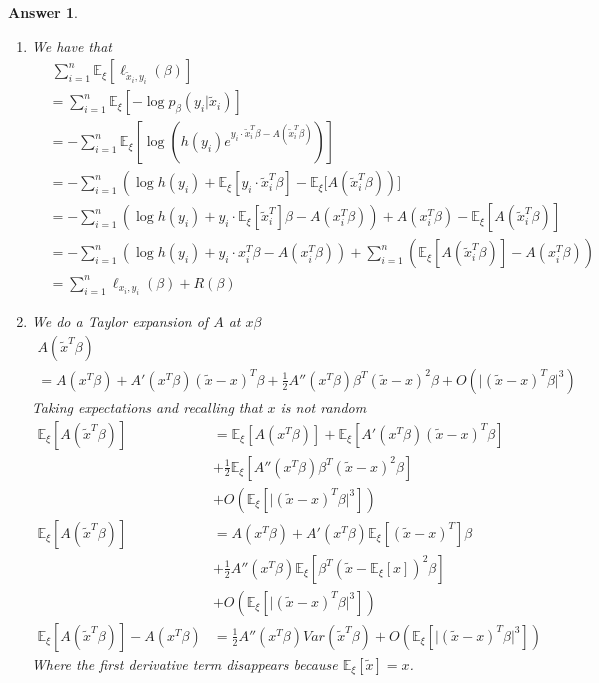 \documentclass[12pt]{article}
\theoremstyle{colon}
\newtheorem*{answer}{Answer}
\begin{document}
\begin{answer}
  \leavevmode
  \begin{enumerate}[label=\arabic*)]
    \item We have that
      \begin{align*}
        &\ \sum_{i=1}^n \mathbb{E}_\xi [\ell_{\tilde{x}_i, y_i}(\beta)] \\
        &= \sum_{i=1}^n \mathbb{E}_\xi [-\log p_\beta (y_i | \tilde{x}_i)] \\
        &= -\sum_{i=1}^n \mathbb{E}_\xi [\log \left( h(y_i) e^{y_i \cdot \tilde{x}_i^T \beta - A(\tilde{x}_i^T \beta)} \right)] \\
        &= -\sum_{i=1}^n \left( \log h(y_i) + \mathbb{E}_\xi [y_i \cdot \tilde{x}_i^T \beta] - \mathbb{E}_\xi [A(\tilde{x}_i^T \beta) \right)] \\
        &= -\sum_{i=1}^n \left( \log h(y_i) + y_i \cdot \mathbb{E}_\xi [\tilde{x}_i^T] \beta - A(x_i^T \beta) \right) + A(x_i^T \beta) - \mathbb{E}_\xi [A(\tilde{x}_i^T \beta)] \\
        &= -\sum_{i=1}^n \left( \log h(y_i) + y_i \cdot x_i^T \beta - A(x_i^T \beta) \right) + \sum_{i=1}^n \left( \mathbb{E}_\xi [A(\tilde{x}_i^T \beta)] - A(x_i^T \beta) \right) \\
        &= \sum_{i=1}^n \ell_{x_i, y_i}(\beta) + R(\beta)
      \end{align*}

    \item We do a Taylor expansion of $A$ at $x \beta$
      \begin{gather*}
        A(\tilde{x}^T \beta) \\
        = A(x^T \beta) + A'(x^T \beta) (\tilde{x} - x)^T \beta + \frac{1}{2} A''(x^T \beta) \beta^T (\tilde{x} - x)^2 \beta + O(\lvert (\tilde{x} - x)^T \beta \rvert^3)
      \end{gather*}
      Taking expectations and recalling that $x$ is not random
      \begin{align*}
        \mathbb{E}_\xi [A(\tilde{x}^T \beta)] &= \mathbb{E}_\xi [A(x^T \beta)] + \mathbb{E}_\xi [A'(x^T \beta) (\tilde{x} - x)^T \beta] \\
        &+ \frac{1}{2} \mathbb{E}_\xi [A''(x^T \beta) \beta^T (\tilde{x} - x)^2 \beta] \\
        &+ O(\mathbb{E}_\xi [\lvert (\tilde{x} - x)^T \beta \rvert^3]) \\
        \mathbb{E}_\xi [A(\tilde{x}^T \beta)] &= A(x^T \beta) + A'(x^T \beta) \mathbb{E}_\xi [ (\tilde{x} - x)^T ] \beta \\
        &+ \frac{1}{2} A''(x^T \beta) \mathbb{E}_\xi [ \beta^T (\tilde{x} - \mathbb{E}_\xi[x])^2 \beta] \\
        &+ O(\mathbb{E}_\xi [\lvert (\tilde{x} - x)^T \beta \rvert^3]) \\
        \mathbb{E}_\xi [A(\tilde{x}^T \beta)] - A(x^T \beta) &= \frac{1}{2} A''(x^T \beta) Var(\tilde{x}^T \beta) + O(\mathbb{E}_\xi [\lvert (\tilde{x} - x)^T \beta \rvert^3])
      \end{align*}
      Where the first derivative term disappears because $\mathbb{E}_\xi [\tilde{x}] = x$.


\end{enumerate}
\end{answer}
\end{document}
